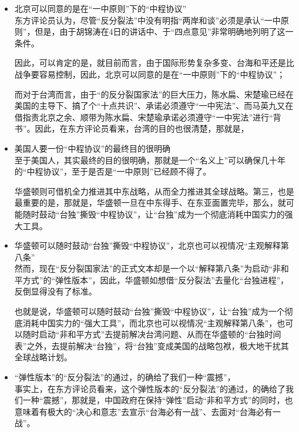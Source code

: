 \documentclass[a4paper,11pt]{article}
\begin{document}
\begin{itemize}
\begin{itemize}
\item 北京可以同意的是在“一中原则”下的“中程协议”\\
\label{sec-2_3_8}%
东方评论员认为，尽管“反分裂法”中没有明指“两岸和谈”必须是承认“一中原则”，但是，由于胡锦涛在4日的讲话中、于“四点意见”非常明确地列明了这一条件。

    因此，可以肯定的是，就目前而言，由于国际形势复杂多变、台海和平还是比战争要容易控制，因此，北京可以同意的是在“一中原则”下的“中程协议”；

    而对于台湾而言，由于“的反分裂国家法”的巨大压力，陈水扁、宋楚瑜已经在美国的主导下、搞了个“十点共识”、承诺必须遵守“一中宪法”、而马英九又在借指责北京之余、顺带为陈水扁、宋楚瑜承诺必须遵守“一中宪法”进行“背书”。因此，在东方评论员看来，台湾的目的也很清楚，那就是，
 

\item 美国人要一份“中程协议”的最终目的很明确\\
\label{sec-2_3_9}%
至于美国人，其实最终的目的很明确，那就是一个“名义上”可以确保几十年的“中程协议”，至于是否是“一中原则”已经顾不得了。


    华盛顿则可借机全力推进其中东战略，从而全力推进其全球战略。第三，也是最重要的是，那就是，华盛顿一旦在中东得手、在东亚面置完毕，那么，就可能随时鼓动“台独”撕毁“中程协议”，让“台独”成为一个彻底消耗中国实力的强大工具。
 

\item 华盛顿可以随时鼓动“台独”撕毁“中程协议”，北京也可以视情况“主观解释第八条”\\
\label{sec-2_3_10}%
然而，现在“反分裂国家法”的正式文本却是一个以“解释第八条”为启动“非和平方式”的“弹性版本”，因此，华盛顿如想借“反分裂法”去量化“台独进程”，反倒显得没有了标准。

    也就是说，华盛顿可以随时鼓动“台独”撕毁“中程协议”，让“台独”成为一个彻底消耗中国实力的“强大工具”，而北京也可以视情况“主观解释第八条”，也可以随时启动“非和平方式”去提前解决台湾问题、从而在华盛顿的“台独时间表”之外，去提前解决“台独”，将“台独”变成美国的战略包袱，极大地干扰其全球战略计划。
 

\item “弹性版本”的“反分裂法”的通过，的确给了我们一种“震撼”，\\
\label{sec-2_3_11}%
事实上，在东方评论员看来，这个弹性版本的“反分裂法”的通过，的确给了我们一种“震撼”，那就是，中国政府在保持“弹性”启动“非和平方式”的同时，也意味着有极大的“决心和意志”去宣示“台海必有一战”、去面对“台海必有一战”。
 

\end{itemize}
\end{itemize}
\end{document}

